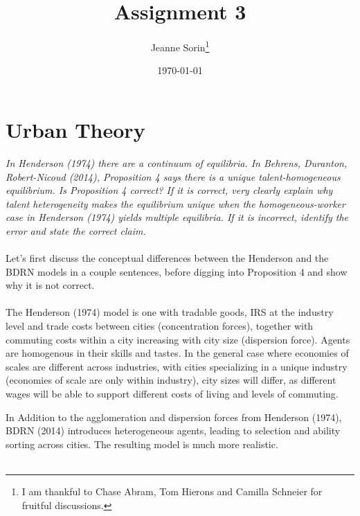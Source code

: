 \documentclass[10pt, final]{article}
\title{Assignment 3}
\author{Jeanne Sorin\footnote{I am thankful to Chase Abram, Tom Hierons and Camilla Schneier for fruitful discussions.}}
\date{\today}
\begin{document}
\maketitle
\newcommand{\hatxi}{\hat{\mathbf{x}}^i}
\newcommand{\tildexi}{\tilde{\mathbf{x}}^i}


\maketitle

\section{Urban Theory} %
\label{sec:urban_theory}
\textit{In Henderson (1974) there are a continuum of equilibria. In Behrens, Duranton, Robert-Nicoud (2014), Proposition 4 says there is a unique talent-homogeneous equilibrium. Is Proposition 4 correct? If it is correct, very clearly explain why talent heterogeneity makes the equilibrium unique when the homogeneous-worker case in Henderson (1974) yields multiple equilibria. If it is incorrect, identify the error and state the correct claim.}
\\
\\
Let's first discuss the conceptual differences between the Henderson and the BDRN models in a couple sentences, before digging into Proposition 4 and show why it is not correct.
\\
\\

The Henderson (1974) model is one with tradable goods, IRS at the industry level and trade costs between cities (concentration forces), together with commuting costs within a city increasing with city size (dispersion force). Agents are homogenous in their skills and tastes. In the general case where economies of scales are different across industries, with cities specializing in a unique industry (economies of scale are only within industry), city sizes will differ, as different wages will be able to support different costs of living and levels of commuting.

In Addition to the agglomeration and dispersion forces from Henderson (1974), BDRN (2014) introduces heterogeneous agents, leading to selection and ability sorting across cities. The resulting model is much more realistic.
\\
\\
\end{document}
